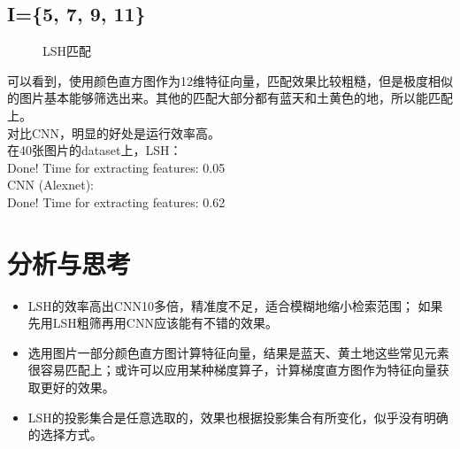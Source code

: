 \documentclass[12pt,a4paper]{article}
\begin{document}
\subsection{I=\{5, 7, 9, 11\}}
\begin{figure}[H]
	\caption{LSH匹配}
	\centering
\end{figure}
可以看到，使用颜色直方图作为12维特征向量，匹配效果比较粗糙，但是极度相似的图片基本能够筛选出来。其他的匹配大部分都有蓝天和土黄色的地，所以能匹配上。\\
对比CNN，明显的好处是运行效率高。\\
在40张图片的dataset上，LSH：\\
Done! Time for extracting features: 0.05\\
CNN (Alexnet): \\
Done! Time for extracting features: 0.62\\


\section{分析与思考}
\begin{itemize}
\item LSH的效率高出CNN10多倍，精准度不足，适合模糊地缩小检索范围； 如果先用LSH粗筛再用CNN应该能有不错的效果。
\item 选用图片一部分颜色直方图计算特征向量，结果是蓝天、黄土地这些常见元素很容易匹配上；或许可以应用某种梯度算子，计算梯度直方图作为特征向量获取更好的效果。
\item LSH的投影集合是任意选取的，效果也根据投影集合有所变化，似乎没有明确的选择方式。
\end{itemize}
\end{document}
